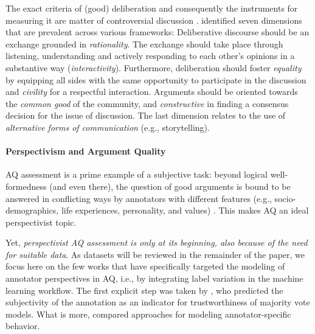 The exact criteria of (good) deliberation and consequently the instruments for measuring it are matter of controversial discussion \cite{dellicarpini2003deliberation}. \citet{friess2015deliberation} identified seven dimensions that are prevalent across various frameworks: Deliberative discourse should be an exchange grounded in \textit{rationality}. The exchange should take place through listening, understanding and actively responding to each other's opinions in a substantive way (\textit{interactivity}). Furthermore, deliberation should foster \textit{equality} by equipping all sides with the same opportunity to participate in the discussion and \textit{civility} for a respectful interaction. Arguments should be oriented towards the \textit{common good} of the community, and \textit{constructive} in finding a consensus decision for the issue of discussion. The last dimension relates to the use of \textit{alternative forms of communication} (e.g., storytelling).


\paragraph{Perspectivism and Argument Quality}

AQ assessment is a prime example of a subjective task: beyond logical well-formedness (and even there), the question of good arguments is bound to be answered in conflicting ways by annotators with different features (e.g., socio-demographics, life experiences, personality, and values) \cite{lukin-etal-2017-argument,durmus-cardie-2019-corpus,el-baff-etal-2020-analyzing}. This makes AQ an ideal perspectivist topic. 

Yet, \textit{perspectivist AQ assessment is only at its beginning, also because of the need for suitable data}. As datasets will be reviewed in the remainder of the paper, we focus here on the few works that have specifically targeted the {modeling of annotator perspectives} in AQ, i.e., by integrating label variation in the machine learning workflow. The first explicit step was taken by \citet{romberg-2022-perspective}, who predicted the subjectivity of the annotation as an indicator for trustworthiness of majority vote models. What is more, \citet{heinisch-etal-2023-architectural} compared approaches for modeling annotator-specific behavior.